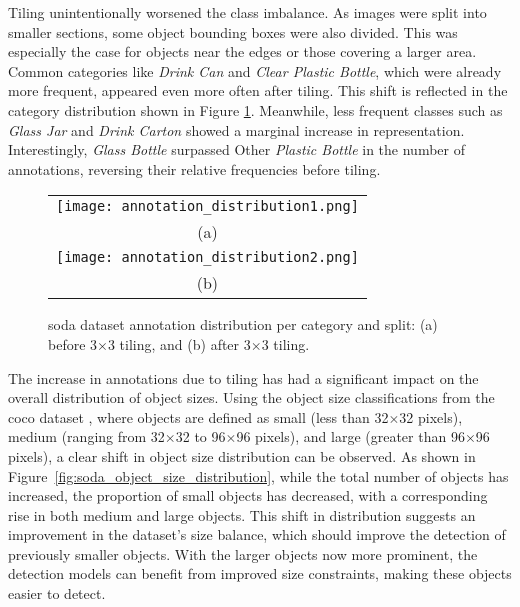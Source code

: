 Tiling unintentionally worsened the class imbalance. As images were split into smaller sections, some object bounding boxes were also divided. This was especially the case for objects near the edges or those covering a larger area. Common categories like \textit{Drink Can} and \textit{Clear Plastic Bottle}, which were already more frequent, appeared even more often after tiling. This shift is reflected in the category distribution shown in Figure \ref{fig:soda_annotation_distribution}.
Meanwhile, less frequent classes such as \textit{Glass Jar} and \textit{Drink Carton} showed a marginal increase in representation. Interestingly, \textit{Glass Bottle} surpassed Other \textit{Plastic Bottle} in the number of annotations, reversing their relative frequencies before tiling.

\begin{figure}[!ht]
  \centering
  \begin{tabular}{c}
    \texttt{[image: annotation\_distribution1.png]} \\
    \small (a) \\
    \addlinespace[1em]
    \texttt{[image: annotation\_distribution2.png]} \\
    \small (b) \\
  \end{tabular}
  \caption{\gls{soda} dataset annotation distribution per category and split: (a) before 3$\times$3 tiling, and (b) after 3$\times$3 tiling.}
  \label{fig:soda_annotation_distribution}
\end{figure}

The increase in annotations due to tiling has had a significant impact on the overall distribution of object sizes. Using the object size classifications from the \gls{coco} dataset \cite{coco}, where objects are defined as small (less than 32$\times$32 pixels), medium (ranging from 32$\times$32 to 96$\times$96 pixels), and large (greater than 96$\times$96 pixels), a clear shift in object size distribution can be observed. As shown in Figure~\ref{fig:soda_object_size_distribution}, while the total number of objects has increased, the proportion of small objects has decreased, with a corresponding rise in both medium and large objects. This shift in distribution suggests an improvement in the dataset’s size balance, which should improve the detection of previously smaller objects. With the larger objects now more prominent, the detection models can benefit from improved size constraints, making these objects easier to detect.

